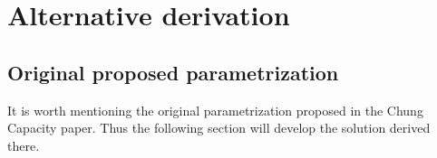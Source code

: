 \documentclass[12pt]{article}
\begin{document}
\pagebreak

\section{Alternative derivation}
\subsection{Original proposed parametrization}

It is worth mentioning the original parametrization proposed in the Chung Capacity paper. Thus the following section will develop the solution derived there.
\linebreak
\end{document}
